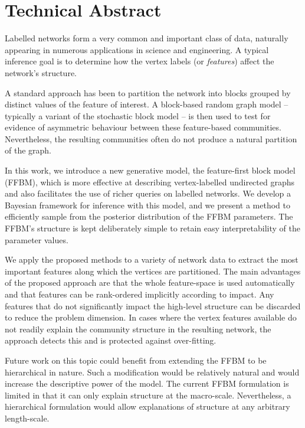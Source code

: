 \section*{Technical Abstract}
Labelled networks form a very common and important class of data,
naturally appearing in numerous applications in science and engineering.
A typical inference goal is to determine how the vertex labels
(or {\em features}) affect the network's structure.

A standard approach has been to partition the network into blocks grouped
by distinct values of the feature of interest. A block-based random
graph model -- typically a variant of the stochastic block model --
is then used to test for evidence of asymmetric behaviour between these
feature-based communities. Nevertheless, the resulting communities
often do not produce a natural partition of the graph.

In this work, we introduce a new generative model, the feature-first block model (FFBM),
which is more effective at describing vertex-labelled undirected
graphs and also facilitates the use of richer queries on labelled networks.
We develop a Bayesian framework for inference with this model,
and we present a method to efficiently sample from the posterior
distribution of the FFBM parameters. The FFBM's structure is kept
deliberately simple to retain easy interpretability of the parameter
values.

We apply the proposed methods to a variety of network data
to extract the most important features along which the vertices
are partitioned. The main advantages of the proposed approach are
that the whole feature-space is used automatically and that features
can be rank-ordered implicitly according to impact. Any features
that do not significantly impact the high-level structure can be
discarded to reduce the problem dimension. In cases where the vertex
features available do not readily explain the community structure
in the resulting network, the approach detects this and is protected
against over-fitting.

Future work on this topic could benefit from extending the FFBM to be hierarchical in nature. Such a modification would be relatively natural and would increase the descriptive power of the model. The current FFBM formulation is limited in that it can only explain structure at the macro-scale. Nevertheless, a hierarchical formulation would allow explanations of structure at any arbitrary length-scale.